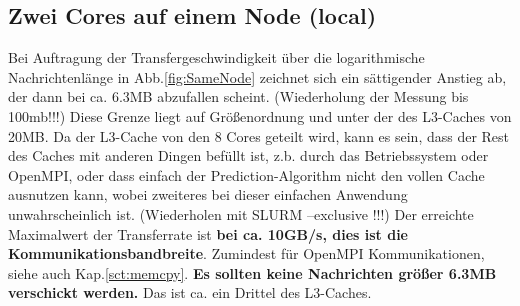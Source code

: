 \documentclass[12pt,a4paper]{article}
\begin{document}
%
%
%


\subsection{Zwei Cores auf einem Node (local)}


Bei Auftragung der Transfergeschwindigkeit über die logarithmische Nachrichtenlänge in Abb.\ref{fig:SameNode} zeichnet sich ein sättigender Anstieg ab, der dann bei ca. 6.3MB abzufallen scheint. (Wiederholung der Messung bis 100mb!!!) Diese Grenze liegt auf Größenordnung und unter der des L3-Caches von 20MB. Da der L3-Cache von den 8 Cores geteilt wird, kann es sein, dass der Rest des Caches mit anderen Dingen befüllt ist, z.b. durch das Betriebssystem oder OpenMPI, oder dass einfach der Prediction-Algorithm nicht den vollen Cache ausnutzen kann, wobei zweiteres bei dieser einfachen Anwendung unwahrscheinlich ist. (Wiederholen mit SLURM --exclusive !!!) Der erreichte Maximalwert der Transferrate ist \textbf{bei ca. 10GB/s, dies ist die Kommunikationsbandbreite}. Zumindest für OpenMPI Kommunikationen, siehe auch Kap.\ref{sct:memcpy}. \textbf{Es sollten keine Nachrichten größer 6.3MB verschickt werden.} Das ist ca. ein Drittel des L3-Caches.\\
\end{document}
